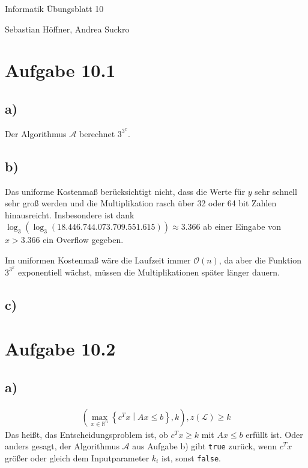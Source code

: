 \documentclass{article}
\begin{document}
\begin{center}
  \Large{Informatik \raisebox{0.05em}{:} Übungsblatt 10}

  \large{Sebastian Höffner, Andrea Suckro}
\end{center}



\section*{Aufgabe 10.1}
\subsection*{a)}
Der Algorithmus $\mathcal{A}$ berechnet $3^{3^x}$.


\subsection*{b)}
Das uniforme Kostenmaß berücksichtigt nicht, dass die Werte für $y$ sehr schnell sehr groß werden und die Multiplikation rasch über 32 oder 64 bit Zahlen hinausreicht.
Insbesondere ist dank $\log_3(\log_3(18.446.744.073.709.551.615)) \approx 3.366$ ab einer Eingabe von $x > 3.366$ ein Overflow gegeben.

Im uniformen Kostenmaß wäre die Laufzeit immer $\mathcal{O}(n)$, da aber die Funktion $3^{3^x}$ exponentiell wächst, müssen die Multiplikationen später länger dauern.


\subsection*{c)}




\section*{Aufgabe 10.2}

\subsection*{a)}
\begin{align*}
\left(\max\limits_{x\in\mathbb{R}^n}\left\{c^Tx\middle|Ax\leq b\right\}, k\right), z(\mathcal{L})\geq k
\end{align*}
Das heißt, das Entscheidungsproblem ist, ob $c^Tx \geq k$ mit $Ax \leq b$ erfüllt ist.
Oder anders gesagt, der Algorithmus $\mathcal{A}$ aus Aufgabe b) gibt \texttt{true} zurück, wenn $c^Tx$ größer oder gleich dem Inputparameter $k_i$ ist, sonst \texttt{false}.
\end{document}
